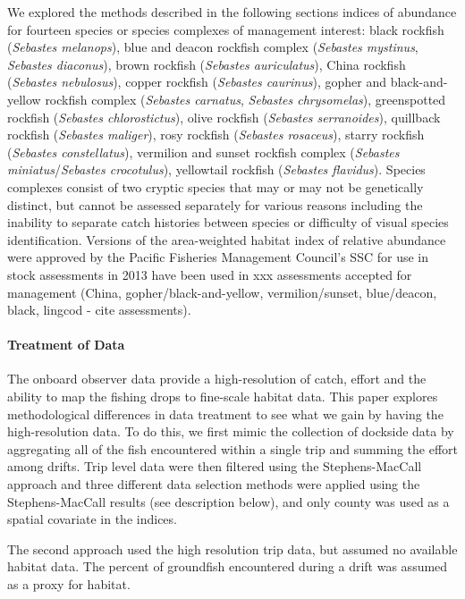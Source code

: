 \documentclass[]{elsarticle} %
\begin{document}
We explored the methods described in the following sections indices of
abundance for fourteen species or species complexes of management
interest: black rockfish (\emph{Sebastes melanops}), blue and deacon
rockfish complex (\emph{Sebastes mystinus}, \emph{Sebastes diaconus}),
brown rockfish (\emph{Sebastes auriculatus}), China rockfish
(\emph{Sebastes nebulosus}), copper rockfish (\emph{Sebastes caurinus}),
gopher and black-and-yellow rockfish complex (\emph{Sebastes carnatus},
\emph{Sebastes chrysomelas}), greenspotted rockfish (\emph{Sebastes
chlorostictus}), olive rockfish (\emph{Sebastes serranoides}), quillback
rockfish (\emph{Sebastes maliger}), rosy rockfish (\emph{Sebastes
rosaceus}), starry rockfish (\emph{Sebastes constellatus}), vermilion
and sunset rockfish complex (\emph{Sebastes miniatus}/\emph{Sebastes
crocotulus}), yellowtail rockfish (\emph{Sebastes flavidus}). Species
complexes consist of two cryptic species that may or may not be
genetically distinct, but cannot be assessed separately for various
reasons including the inability to separate catch histories between
species or difficulty of visual species identification. Versions of the
area-weighted habitat index of relative abundance were approved by the
Pacific Fisheries Management Council's SSC for use in stock assessments
in 2013 have been used in xxx assessments accepted for management
(China, gopher/black-and-yellow, vermilion/sunset, blue/deacon, black,
lingcod - cite assessments).

\hypertarget{treatment-of-data}{%
\paragraph{Treatment of Data}\label{treatment-of-data}}

The onboard observer data provide a high-resolution of catch, effort and
the ability to map the fishing drops to fine-scale habitat data. This
paper explores methodological differences in data treatment to see what
we gain by having the high-resolution data. To do this, we first mimic
the collection of dockside data by aggregating all of the fish
encountered within a single trip and summing the effort among drifts.
Trip level data were then filtered using the Stephens-MacCall approach
and three different data selection methods were applied using the
Stephens-MacCall results (see description below), and only county was
used as a spatial covariate in the indices.

The second approach used the high resolution trip data, but assumed no
available habitat data. The percent of groundfish encountered during a
drift was assumed as a proxy for habitat.
\end{document}
